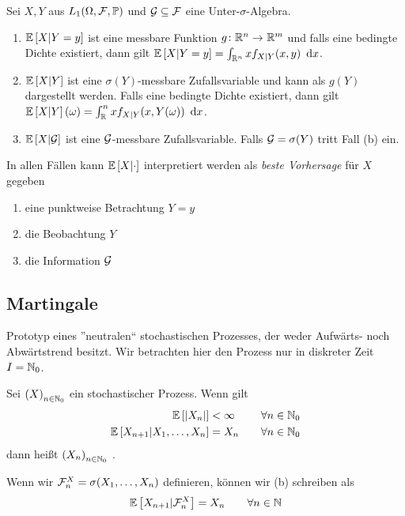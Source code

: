 Sei $X,Y$ aus $L_1(\Omega,\mathcal{F},\mathbb{P})$ und $\mathcal{G} \subseteq \mathcal{F}$ eine Unter-$\sigma$-Algebra. 
\begin{enumerate}[label=(\alph*),nolistsep,topsep=-\parskip]
	\item $\mathbb{E} \left[ X|Y=y \right]$ ist eine messbare Funktion $\abb{g}{\Rn}{\R^m}$ und falls eine bedingte Dichte existiert, dann gilt $\mathbb{E} \left[ X|Y=y \right] = \int_{\mathbb{R}^n} x f_{X|Y}(x,y) \enskip \mathrm{d}x$.
	\item $\mathbb{E} \left[ X|Y \right]$ ist eine $\sigma(Y)$-messbare Zufallsvariable und kann als $g(Y)$ dargestellt werden. Falls eine bedingte Dichte existiert, dann gilt $\mathbb{E} \left[ X|Y \right](\omega) = \int_\mathbb{R}^n x f_{X|Y}(x,Y(\omega)) \enskip \mathrm{d}x$.
	\item $\mathbb{E} \left[ X|\mathcal{G} \right]$ ist eine $\mathcal{G}$-messbare Zufallsvariable. Falls $\mathcal{G}=\sigma(Y)$ tritt Fall (b) ein.
\end{enumerate}
In allen Fällen kann $\mathbb{E} \left[ X|\cdot \right]$ interpretiert werden als \textit{beste Vorhersage} für $X$ gegeben
\begin{enumerate}[label=(\alph*),nolistsep,topsep=-\parskip]
	\item eine punktweise Betrachtung $Y=y$
	\item die Beobachtung $Y$
	\item die Information $\mathcal{G}$
\end{enumerate}

\subsection{Martingale}

Prototyp eines ''neutralen`` stochastischen Prozesses, der weder Aufwärts- noch Abwärtstrend besitzt. Wir betrachten hier den Prozess nur in diskreter Zeit $I = \mathbb{N}_0$.

\begin{definition}
	Sei $\left( X \right)_{n \in \mathbb{N}_0}$ ein stochastischer Prozess. Wenn gilt
	\begin{equation}
	\begin{alignedat}{2}
		\mathbb{E} \left[ \left| X_n \right| \right] &< \infty \qquad &\forall n \in \mathbb{N}_0 \\
		\mathbb{E} \left[ X_{n+1}|X_1,\dots,X_n \right] &= X_n \qquad &\forall n \in \mathbb{N}_0 \\
	\end{alignedat}
	\end{equation}
	dann heißt $\left( X_n \right)_{n \in \mathbb{N}_0}$ .
\end{definition}

Wenn wir $\mathcal{F}_n^X = \sigma(X_1,\dots,X_n)$ definieren, können wir (b) schreiben als 
\begin{equation*}
	\mathbb{E} \left[ X_{n+1}|\mathcal{F}_n^X \right] = X_n \qquad \forall n \in \mathbb{N}
\end{equation*}

